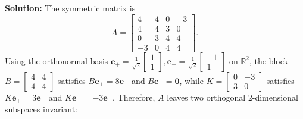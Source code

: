\documentclass[11pt, letterpaper]{article}
\theoremstyle{definition}
\theoremstyle{remark}
\begin{document}
\textbf{Solution:}
The symmetric matrix is
\[
A = \begin{bmatrix} 4 & 4 & 0 & -3 \\ 4 & 4 & 3 & 0 \\ 0 & 3 & 4 & 4 \\ -3 & 0 & 4 & 4 \end{bmatrix}.
\]
Using the orthonormal basis $\mathbf{e}_+ = \frac{1}{\sqrt{2}}\begin{bmatrix} 1 \\ 1 \end{bmatrix}, \mathbf{e}_- = \frac{1}{\sqrt{2}}\begin{bmatrix} -1 \\ 1 \end{bmatrix}$ on $\mathbb{R}^2$, the block $B = \begin{bmatrix} 4 & 4 \\ 4 & 4 \end{bmatrix}$ satisfies $B\mathbf{e}_+ = 8\mathbf{e}_+$ and $B\mathbf{e}_- = \mathbf{0}$, while $K = \begin{bmatrix} 0 & -3 \\ 3 & 0 \end{bmatrix}$ satisfies $K\mathbf{e}_+ = 3\mathbf{e}_-$ and $K\mathbf{e}_- = -3\mathbf{e}_+$. Therefore, $A$ leaves two orthogonal $2$-dimensional subspaces invariant:
\end{document}
